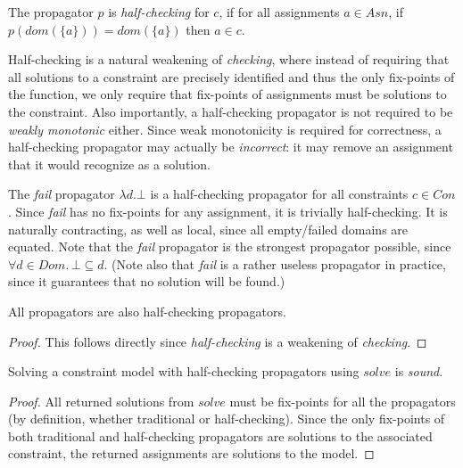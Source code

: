 \documentclass[runningheads]{llncs}
\newcommand{\Asn}{\ensuremath{\mathit{Asn}}}
\newcommand{\Con}{\ensuremath{\mathit{Con}}}
\newcommand{\Dom}{\ensuremath{\mathit{Dom}}}
\newcommand{\dom}{\ensuremath{\mathit{dom}}}
\newcommand{\solve}{\ensuremath{\mathit{solve}}}
\begin{document}
\begin{definition}
  The propagator $p$ is \emph{half-checking} for $c$, if for all
  assignments $a\in\Asn$, if $p(\dom(\{a\}))=\dom(\{a\})$ then
  $a\in c$.
\end{definition}

Half-checking is a natural weakening of \emph{checking}, where instead
of requiring that all solutions to a constraint are precisely
identified and thus the only fix-points of the function, we only
require that fix-points of assignments must be solutions to the
constraint. Also importantly, a half-checking propagator is not
required to be \emph{weakly monotonic} either. Since weak monotonicity
is required for correctness,
a half-checking propagator may actually be \emph{incorrect}: it may
remove an assignment that it would recognize as a solution.

\begin{example}
  The \emph{fail} propagator $\lambda d.\bot$ is a half-checking
  propagator for all constraints $c\in\Con$. Since \emph{fail} has no
  fix-points for any assignment, it is trivially half-checking. It is
  naturally contracting, as well as local, since all empty/failed
  domains are equated. Note that the \emph{fail} propagator is the
  strongest propagator possible, since
  $\forall d\in \Dom.\, \bot\subseteq d$. (Note also that \emph{fail} is
  a rather useless propagator in practice, since it guarantees that no
  solution will be found.)
  \label{ex:fail}
\end{example}

\begin{theorem}
  All propagators are also half-checking propagators.
\end{theorem}
\begin{proof}
This follows directly since \emph{half-checking} is a weakening of
 \emph{checking}.  
\end{proof}

\begin{theorem}
  Solving a constraint model with half-checking propagators using
  $\solve$ is \emph{sound}.
\end{theorem}
\begin{proof}
  All returned solutions from $solve$ must be fix-points for all the
  propagators (by definition, whether traditional or
  half-checking). Since the only fix-points of both traditional and
  half-checking propagators are solutions to the associated
  constraint, the returned assignments are solutions to the model.
\end{proof}
\end{document}
